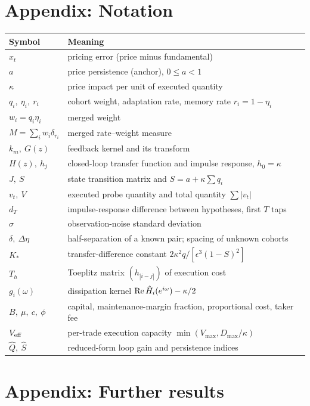 \section{Appendix: Notation}\label{p1:app:notation}

\begin{longtable}{p{}p{}}
\toprule
Symbol & Meaning\\
\midrule
\endhead
$x_t$ & pricing error (price minus fundamental)\\
$a$ & price persistence (anchor), $0\le a<1$\\
$\kappa$ & price impact per unit of executed quantity\\
$q_i,\ \eta_i,\ r_i$ & cohort weight, adaptation rate, memory rate $r_i=1-\eta_i$\\
$w_i=q_i\eta_i$ & merged weight\\
$M=\sum_iw_i\delta_{r_i}$ & merged rate--weight measure\\
$k_m,\ G(z)$ & feedback kernel and its transform\\
$H(z),\ h_j$ & closed-loop transfer function and impulse response, $h_0=\kappa$\\
$J,\ S$ & state transition matrix and $S=a+\kappa\sum q_i$\\
$v_t,\ V$ & executed probe quantity and total quantity $\sum|v_t|$\\
$d_T$ & impulse-response difference between hypotheses, first $T$ taps\\
$\sigma$ & observation-noise standard deviation\\
$\delta,\ \Delta\eta$ & half-separation of a known pair; spacing of unknown cohorts\\
$K_*$ & transfer-difference constant $2\kappa^2q/[\epsilon^3(1-S)^2]$\\
$T_h$ & Toeplitz matrix $(h_{|i-j|})$ of execution cost\\
$g_i(\omega)$ & dissipation kernel ${\rm Re}\,\hat H_i(e^{i\omega})-\kappa/2$\\
$B,\ \mu,\ c,\ \phi$ & capital, maintenance-margin fraction, proportional cost, taker fee\\
$V_{\rm eff}$ & per-trade execution capacity $\min(V_{\max},D_{\max}/\kappa)$\\
$\hat Q,\ \hat S$ & reduced-form loop gain and persistence indices\\
\bottomrule
\end{longtable}

\section{Appendix: Further results}\label{p1:app:ia}

